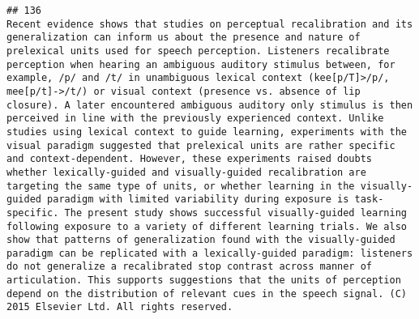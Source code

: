 \documentclass[
  english,
  man]{apa6}
\begin{document}
\begin{verbatim}
## 136                                                                                                                                                                                                                                                                                                                                                                                                                                                                                                                                                                                                                                                                                                                                                                                                                                                                                                                                                                                                                                                                                                                                                          Recent evidence shows that studies on perceptual recalibration and its generalization can inform us about the presence and nature of prelexical units used for speech perception. Listeners recalibrate perception when hearing an ambiguous auditory stimulus between, for example, /p/ and /t/ in unambiguous lexical context (kee[p/T]>/p/, mee[p/t]->/t/) or visual context (presence vs. absence of lip closure). A later encountered ambiguous auditory only stimulus is then perceived in line with the previously experienced context. Unlike studies using lexical context to guide learning, experiments with the visual paradigm suggested that prelexical units are rather specific and context-dependent. However, these experiments raised doubts whether lexically-guided and visually-guided recalibration are targeting the same type of units, or whether learning in the visually-guided paradigm with limited variability during exposure is task-specific. The present study shows successful visually-guided learning following exposure to a variety of different learning trials. We also show that patterns of generalization found with the visually-guided paradigm can be replicated with a lexically-guided paradigm: listeners do not generalize a recalibrated stop contrast across manner of articulation. This supports suggestions that the units of perception depend on the distribution of relevant cues in the speech signal. (C) 2015 Elsevier Ltd. All rights reserved.

\end{verbatim}
\end{document}
